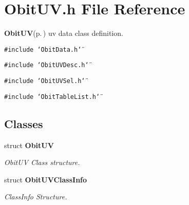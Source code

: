 \section{Obit\-UV.h File Reference}
\label{ObitUV_8h}
{\bf Obit\-UV}{\rm (p.\,\pageref{structObitUV})} uv data class definition. 

{\tt \#include \char`\"{}Obit\-Data.h\char`\"{}}\par
{\tt \#include \char`\"{}Obit\-UVDesc.h\char`\"{}}\par
{\tt \#include \char`\"{}Obit\-UVSel.h\char`\"{}}\par
{\tt \#include \char`\"{}Obit\-Table\-List.h\char`\"{}}\par
\subsection*{Classes}
\begin{CompactItemize}
\item 
struct {\bf Obit\-UV}
\begin{CompactList}\small\item\em Obit\-UV Class structure. \item\end{CompactList}\item 
struct {\bf Obit\-UVClass\-Info}
\begin{CompactList}\small\item\em Class\-Info Structure. \item\end{CompactList}\end{CompactItemize}
